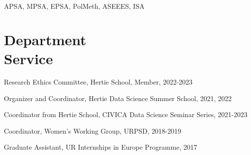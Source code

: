\documentclass[margin,line,10.95pt]{res}
\begin{document}
\begin{resume}
APSA, MPSA, EPSA, PolMeth, ASEEES, ISA

\section{\sc Department \\ Service}

Research Ethics Committee, Hertie School, Member, 2022-2023
\vspace*{-4.5mm}

Organizer and Coordinator, Hertie Data Science Summer School, 2021, 2022
\vspace*{-4.5mm}

Coordinator from Hertie School, CIVICA Data Science Seminar Series, 2021-2023
\vspace*{-3.5mm}

Coordinator, Women's Working Group,  URPSD,  2018-2019
\vspace*{-4.5mm}

Graduate Assistant, UR Internships in Europe Programme,  2017






\end{resume}
\end{document}
